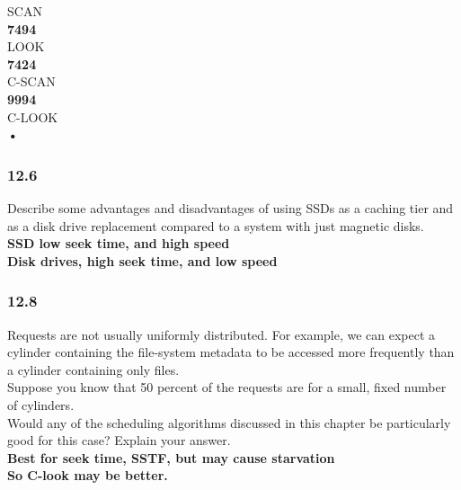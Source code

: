 \documentclass[a4paper,10pt,titlepage]{report}
\begin{document}
\hspace{10mm} 	SCAN    \\
\hspace{15mm}\textbf{7494} \\

\hspace{10mm} 	LOOK    \\
\hspace{15mm}\textbf{7424} \\

\hspace{10mm} 	C-SCAN  \\ 
\hspace{15mm}\textbf{9994} \\

\hspace{10mm} 	C-LOOK  \\
\hspace{15mm}\textbf{•} \\
	
	
\subsubsection{12.6} Describe some advantages and disadvantages of using SSDs as a caching tier and as a disk drive replacement compared to a system with just magnetic disks. \\
\hspace{15mm}\textbf{SSD low seek time, and high speed} \\

\hspace{15mm}\textbf{Disk drives, high seek time, and low speed} \\

\subsubsection{12.8} Requests are not usually uniformly distributed. For example, we can expect a cylinder containing the file-system metadata to be accessed more frequently than a cylinder containing only files.\\ 

\hspace{10mm} Suppose you know that 50 percent of the requests are for a small, fixed number of cylinders. \\

\hspace{10mm} Would any of the scheduling algorithms discussed in this chapter be particularly good for this case? Explain your answer. \\
\hspace{15mm}\textbf{Best for seek time, SSTF, but may cause starvation} \\
\hspace{15mm}\textbf{So C-look may be better.} \\
\end{document}
